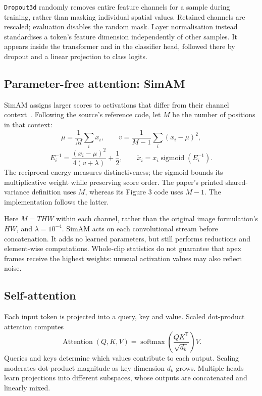 \texttt{Dropout3d} randomly removes entire feature channels for a sample during training, rather than masking individual spatial values. Retained channels are rescaled; evaluation disables the random mask. Layer normalisation instead standardises a token's feature dimension independently of other samples. It appears inside the transformer and in the classifier head, followed there by dropout and a linear projection to class logits.

\subsection{Parameter-free attention: SimAM}
\label{sec:simam}

SimAM assigns larger scores to activations that differ from their channel context~\cite{yang2021}. Following the source's reference code, let $M$ be the number of positions in that context:
\[
    \mu=\frac1M\sum_i x_i,\qquad
    v=\frac1{M-1}\sum_i(x_i-\mu)^2,
\]
\[
    E_i^{-1}=\frac{(x_i-\mu)^2}{4(v+\lambda)}+\frac12,
    \qquad \widetilde x_i=x_i\operatorname{sigmoid}(E_i^{-1}).
\]
The reciprocal energy measures distinctiveness; the sigmoid bounds its multiplicative weight while preserving score order. The paper's printed shared-variance definition uses $M$, whereas its Figure 3 code uses $M-1$. The implementation follows the latter.

Here $M=THW$ within each channel, rather than the original image formulation's $HW$, and $\lambda=10^{-4}$. SimAM acts on each convolutional stream before concatenation. It adds no learned parameters, but still performs reductions and element-wise computations. Whole-clip statistics do not guarantee that apex frames receive the highest weights: unusual activation values may also reflect noise.

\subsection{Self-attention}
\label{sec:self-attention}

Each input token is projected into a query, key and value. Scaled dot-product attention computes
\[
    \operatorname{Attention}(Q,K,V)
      =\operatorname{softmax}\left(\frac{QK^{\mathsf T}}{\sqrt{d_k}}\right)V.
\]
Queries and keys determine which values contribute to each output. Scaling moderates dot-product magnitude as key dimension $d_k$ grows. Multiple heads learn projections into different subspaces, whose outputs are concatenated and linearly mixed.

